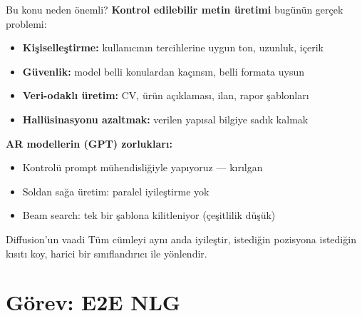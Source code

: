 \documentclass[10pt,aspectratio=169]{beamer}
\begin{document}
\begin{frame}{Bu konu neden önemli?}
  \textbf{Kontrol edilebilir metin üretimi} bugünün gerçek problemi:
  \vspace{0.4em}
  \begin{itemize}
    \item \textbf{Kişiselleştirme:} kullanıcının tercihlerine uygun ton, uzunluk, içerik
    \item \textbf{Güvenlik:} model belli konulardan kaçınsın, belli formata uysun
    \item \textbf{Veri-odaklı üretim:} CV, ürün açıklaması, ilan, rapor şablonları
    \item \textbf{Hallüsinasyonu azaltmak:} verilen yapısal bilgiye sadık kalmak
  \end{itemize}

  \vspace{0.5em}
  \textbf{AR modellerin (GPT) zorlukları:}
  \begin{itemize}
    \item Kontrolü prompt mühendisliğiyle yapıyoruz --- kırılgan
    \item Soldan sağa üretim: paralel iyileştirme yok
    \item Beam search: tek bir şablona kilitleniyor (çeşitlilik düşük)
  \end{itemize}

  \begin{alertblock}{Diffusion'un vaadi}
    Tüm cümleyi aynı anda iyileştir, istediğin pozisyona istediğin kısıtı koy,
    harici bir sınıflandırıcı ile yönlendir.
  \end{alertblock}
\end{frame}

\section{Görev: E2E NLG}
\end{document}
